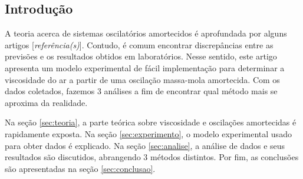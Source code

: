 \documentclass[a4paper, 12pt]{article}
\begin{document}
	\begin{multicols}{2}
		\setlength{\parindent}{4ex}
		\section{Introdução}
			\par A teoria acerca de sistemas oscilatórios amortecidos é aprofundada por alguns artigos [\textit{referência(s)}]. Contudo, é comum encontrar discrepâncias entre as previsões e os resultados obtidos em laboratórios. Nesse sentido, este artigo apresenta um modelo experimental de fácil implementação para determinar a viscosidade do ar a partir de uma oscilação massa-mola amortecida. Com os dados coletados, fazemos 3 análises a fim de encontrar qual método mais se aproxima da realidade.
			\par Na seção \hyperref[sec:teoria]{\ref{sec:teoria}}, a parte teórica sobre viscosidade e oscilações amortecidas é rapidamente exposta. Na seção \hyperref[sec:experimento]{\ref{sec:experimento}}, o modelo experimental usado para obter dados é explicado. Na seção \hyperref[sec:analise]{\ref{sec:analise}}, a análise de dados e seus resultados são discutidos, abrangendo 3 métodos distintos. Por fim, as conclusões são apresentadas na seção \hyperref[sec:conclusao]{\ref{sec:conclusao}}.
			

\end{multicols}
\end{document}
